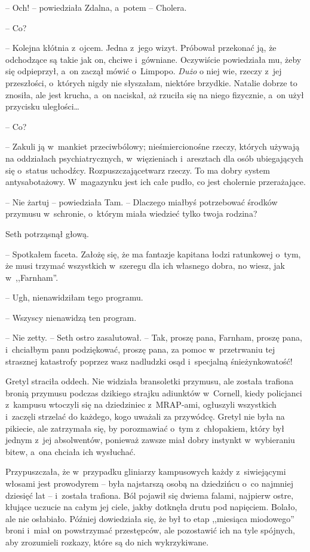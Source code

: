 \documentclass[oneside,polish,11pt,sfheadings]{mwbk}
\begin{document}
-- Och! -- powiedziała Zdalna, a~potem -- Cholera.

-- Co?

-- Kolejna kłótnia z~ojcem. Jedna z~jego wizyt. Próbował przekonać ją, że
odchodzące są takie jak on, chciwe i~gówniane. Oczywiście powiedziała
mu, żeby się odpieprzył, a~on zaczął mówić o~Limpopo. \textit{Dużo }o niej
wie, rzeczy z~jej przeszłości, o~których nigdy nie słyszałam, niektóre
brzydkie. Natalie dobrze to znosiła, ale jest krucha, a~on naciskał, aż
rzuciła się na niego fizycznie, a~on użył przycisku uległości\ldots 

-- Co?

-- Zakuli ją w~mankiet przeciwbólowy; nieśmiercionośne rzeczy, których
używają na oddziałach psychiatrycznych, w~więzieniach i~aresztach dla
osób ubiegających się o~status uchodźcy. Rozpuszczające\dywiz twarz rzeczy. To
ma dobry system antysabotażowy. W~magazynku jest ich całe pudło, co jest
cholernie przerażające.

-- Nie żartuj -- powiedziała Tam. -- Dlaczego miałbyś potrzebować środków
przymusu w~schronie, o~którym miała wiedzieć tylko twoja rodzina?

Seth potrząsnął głową. 

-- Spotkałem faceta. Założę się, że ma fantazje
kapitana łodzi ratunkowej o~tym, że musi trzymać wszystkich w~szeregu
dla ich własnego dobra, no wiesz, jak w~,,Farnham''.

-- Ugh, nienawidziłam tego programu.

-- Wszyscy nienawidzą ten program.

-- Nie zetty. -- Seth ostro zasalutował. -- Tak, proszę pana, Farnham,
proszę pana, i~chciałbym panu podziękować, proszę pana, za pomoc w~przetrwaniu tej strasznej katastrofy poprzez wasz nadludzki osąd i~specjalną śnieżynkowatość!

Gretyl straciła oddech. Nie widziała bransoletki przymusu, ale została
trafiona bronią przymusu podczas dzikiego strajku adiunktów w~Cornell,
kiedy policjanci z~kampusu wtoczyli się na dziedziniec z~MRAP-ami,
ogłuszyli wszystkich i~zaczęli strzelać do każdego, kogo uważali za
przywódcę. Gretyl nie była na pikiecie, ale zatrzymała się, by
porozmawiać o~tym z~chłopakiem, który był jednym z~jej absolwentów,
ponieważ zawsze miał dobry instynkt w~wybieraniu bitew, a~ona chciała
ich wysłuchać.

Przypuszczała, że w~przypadku gliniarzy kampusowych każdy z~siwiejącymi
włosami jest prowodyrem -- była najstarszą osobą na dziedzińcu o~co
najmniej dziesięć lat -- i~została trafiona. Ból pojawił się dwiema
falami, najpierw ostre, kłujące uczucie na całym jej ciele, jakby
dotknęła drutu pod napięciem. Bolało, ale nie osłabiało. Później
dowiedziała się, że był to etap ,,miesiąca miodowego'' broni i~miał on
powstrzymać przestępców, ale pozostawić ich na tyle spójnych, aby
zrozumieli rozkazy, które są do nich wykrzykiwane.
\end{document}
